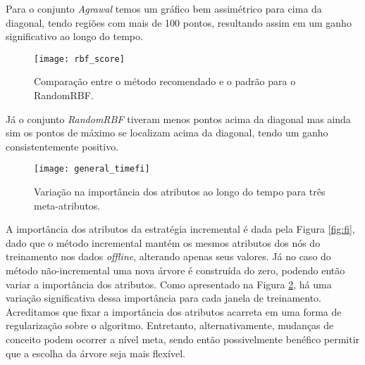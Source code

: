 Para o conjunto \textit{Agrawal} temos um gráfico bem assimétrico para cima da diagonal, tendo regiões com mais de 100 pontos, resultando assim em um ganho significativo ao longo do tempo.

\begin{figure}[!t]
    \centering
    \texttt{[image: rbf\_score]}
    \caption{Comparação entre o método recomendado e o padrão para o RandomRBF.}
    \label{fig:scorecross_rbf}
\end{figure}

Já o conjunto \textit{RandomRBF} tiveram menos pontos acima da diagonal mas ainda sim os pontos de máximo se localizam acima da diagonal, tendo um ganho consistentemente positivo.

\begin{figure}[!t]
    \centering
    \texttt{[image: general\_timefi]}
    \caption{Variação na importância dos atributos ao longo do tempo para três meta-atributos.}
    \label{fig:fi_time}
\end{figure}

A importância dos atributos da estratégia incremental é dada pela Figura \ref{fig:fi}, dado que o método incremental mantém os mesmos atributos dos nós do treinamento nos dados \textit{offline}, alterando apenas seus valores. Já no caso do método não-incremental uma nova árvore é construída do zero, podendo então variar a importância dos atributos. Como apresentado na Figura \ref{fig:fi_time}, há uma variação significativa dessa importância para cada janela de treinamento. Acreditamos que fixar a importância dos atributos acarreta em uma forma de regularização sobre o algoritmo. Entretanto, alternativamente, mudanças de conceito podem ocorrer a nível meta, sendo então possivelmente benéfico permitir que a escolha da árvore seja mais flexível.